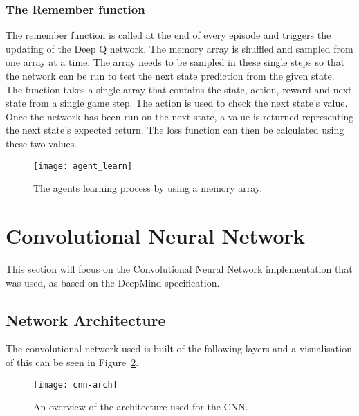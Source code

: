 \subsubsection{The Remember function}

The remember function is called at the end of every episode and triggers the
updating of the Deep Q network. The memory array is shuffled and sampled from one
array at a time. The array needs to be sampled in these single steps so that the
network can be run to test the next state prediction from the given state. The
function takes a single array that contains the state, action, reward and next
state from a single game step. The action is used to check the next state's
value. Once the network has been run on the next state, a value is returned
representing the next state's expected return. The loss function can then be
calculated using these two values.

\begin{figure}[h]
    \centering
    \texttt{[image: agent\_learn]}
    \caption{The agents learning process by using a memory array.}%
    \label{fig:agent_learn}
\end{figure}

\section{Convolutional Neural Network}

This section will focus on the Convolutional Neural Network implementation that
was used, as based on the DeepMind specification.

\subsection{Network Architecture}

The convolutional network used is built of the following layers and a
visualisation of this can be seen in Figure~\ref{fig:cnn_arch}.

\begin{figure}[h]
    \centering
    \texttt{[image: cnn-arch]}
    \caption{An overview of the architecture used for the CNN.}%
    \label{fig:cnn_arch}
\end{figure}


